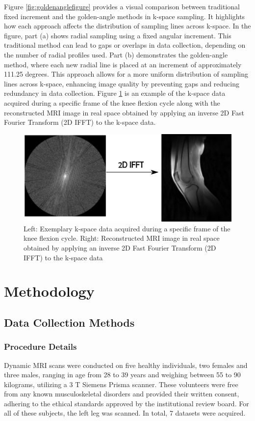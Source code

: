 \documentclass{micro-econ-thesis}
\begin{document}
 
Figure \ref{fig:goldenanglefigure} provides a visual comparison between traditional fixed increment and the golden-angle methods in k-space sampling. It highlights how each approach affects the distribution of sampling lines across k-space. In the figure, part (a) shows radial sampling using a fixed angular increment. This traditional method can lead to gaps or overlaps in data collection, depending on the number of radial profiles used. Part (b) demonstrates the golden-angle method, where each new radial line is placed at an increment of approximately 111.25 degrees. This approach allows for a more uniform distribution of sampling lines across k-space, enhancing image quality by preventing gaps and reducing redundancy in data collection. Figure \ref{fig:kspacearrow} is an example of the k-space data acquired during a specific frame of the knee flexion cycle along with  the reconstructed MRI image in real space obtained by applying an inverse 2D Fast Fourier Transform (2D IFFT) to the k-space data.
\begin{figure}[H]
	\centering
	\includegraphics[scale=0.3]{kspace_arrow_2}
	\caption{Left: Exemplary k-space data acquired during a specific frame of the knee flexion cycle. Right: Reconstructed MRI image in real space obtained by applying an inverse 2D Fast Fourier Transform (2D IFFT) to the k-space data}
	\label{fig:kspacearrow}
\end{figure}
  


\section{Methodology}
\label{sec:second}

\subsection{Data Collection Methods}

\subsubsection{Procedure Details}
Dynamic MRI scans were conducted on five healthy individuals, two females and three males, ranging in age from 28 to 39 years and weighing between 55 to 90 kilograms, utilizing a 3 T Siemens Prisma scanner. These volunteers were free from any known musculoskeletal disorders and provided their written consent, adhering to the ethical standards approved by the institutional review board. For all of these subjects, the left leg was scanned. In total, 7 datasets were acquired. 
\end{document}
